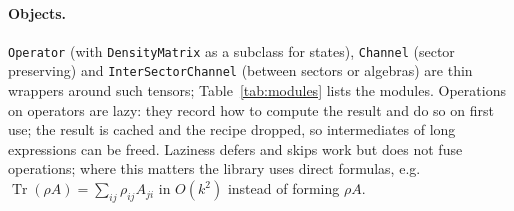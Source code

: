 \documentclass[11pt]{article}
\DeclareMathOperator{\Tr}{Tr}
\begin{document}
\paragraph{Objects.} \texttt{Operator} (with \texttt{DensityMatrix} as a subclass for states),
\texttt{Channel} (sector preserving) and \texttt{InterSectorChannel} (between sectors or algebras) are
thin wrappers around such tensors; Table~\ref{tab:modules} lists the modules. Operations on operators
are lazy: they record how to compute the result and do so on first use; the result is cached and the
recipe dropped, so intermediates of long expressions can be freed. Laziness defers and skips work but
does not fuse operations; where this matters the library uses direct formulas, e.g.\
$\Tr(\rho A)=\sum_{ij}\rho_{ij}A_{ji}$ in $O(k^2)$ instead of forming $\rho A$.
\end{document}
